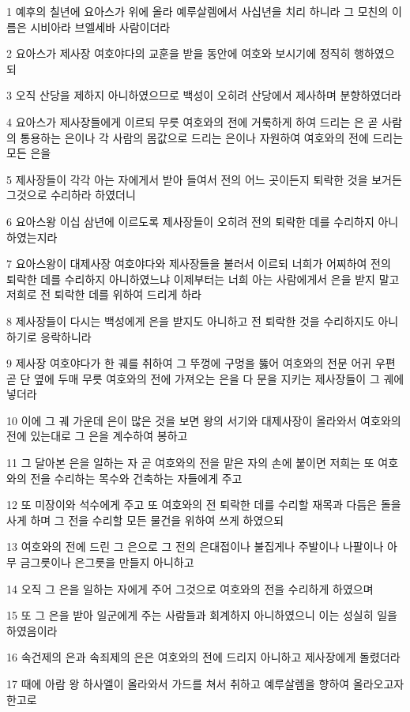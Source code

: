 \par 1 예후의 칠년에 요아스가 위에 올라 예루살렘에서 사십년을 치리 하니라 그 모친의 이름은 시비아라 브엘세바 사람이더라
\par 2 요아스가 제사장 여호야다의 교훈을 받을 동안에 여호와 보시기에 정직히 행하였으되
\par 3 오직 산당을 제하지 아니하였으므로 백성이 오히려 산당에서 제사하며 분향하였더라
\par 4 요아스가 제사장들에게 이르되 무릇 여호와의 전에 거룩하게 하여 드리는 은 곧 사람의 통용하는 은이나 각 사람의 몸값으로 드리는 은이나 자원하여 여호와의 전에 드리는 모든 은을
\par 5 제사장들이 각각 아는 자에게서 받아 들여서 전의 어느 곳이든지 퇴락한 것을 보거든 그것으로 수리하라 하였더니
\par 6 요아스왕 이십 삼년에 이르도록 제사장들이 오히려 전의 퇴락한 데를 수리하지 아니하였는지라
\par 7 요아스왕이 대제사장 여호야다와 제사장들을 불러서 이르되 너희가 어찌하여 전의 퇴락한 데를 수리하지 아니하였느냐 이제부터는 너희 아는 사람에게서 은을 받지 말고 저희로 전 퇴락한 데를 위하여 드리게 하라
\par 8 제사장들이 다시는 백성에게 은을 받지도 아니하고 전 퇴락한 것을 수리하지도 아니하기로 응락하니라
\par 9 제사장 여호야다가 한 궤를 취하여 그 뚜껑에 구멍을 뚫어 여호와의 전문 어귀 우편 곧 단 옆에 두매 무릇 여호와의 전에 가져오는 은을 다 문을 지키는 제사장들이 그 궤에 넣더라
\par 10 이에 그 궤 가운데 은이 많은 것을 보면 왕의 서기와 대제사장이 올라와서 여호와의 전에 있는대로 그 은을 계수하여 봉하고
\par 11 그 달아본 은을 일하는 자 곧 여호와의 전을 맡은 자의 손에 붙이면 저희는 또 여호와의 전을 수리하는 목수와 건축하는 자들에게 주고
\par 12 또 미장이와 석수에게 주고 또 여호와의 전 퇴락한 데를 수리할 재목과 다듬은 돌을 사게 하며 그 전을 수리할 모든 물건을 위하여 쓰게 하였으되
\par 13 여호와의 전에 드린 그 은으로 그 전의 은대접이나 불집게나 주발이나 나팔이나 아무 금그릇이나 은그릇을 만들지 아니하고
\par 14 오직 그 은을 일하는 자에게 주어 그것으로 여호와의 전을 수리하게 하였으며
\par 15 또 그 은을 받아 일군에게 주는 사람들과 회계하지 아니하였으니 이는 성실히 일을 하였음이라
\par 16 속건제의 은과 속죄제의 은은 여호와의 전에 드리지 아니하고 제사장에게 돌렸더라
\par 17 때에 아람 왕 하사엘이 올라와서 가드를 쳐서 취하고 예루살렘을 향하여 올라오고자 한고로
